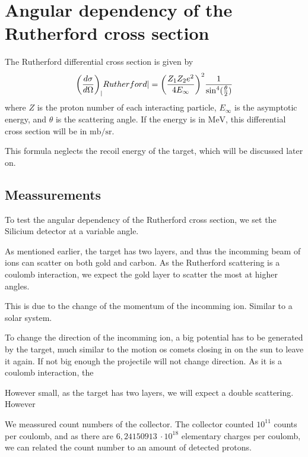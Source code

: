 \section{Angular dependency of the Rutherford cross section}
The Rutherford differential cross section \parencite[p. 16]{noteBB} is given by
\begin{align}
    {\left( \diff[d]{\sigma}{\Omega} \right)}_|Rutherford| =
    {\left(\frac{Z_1Z_2 e^2}{4E_{\infty}} \right)}^2
    \frac{1}{{{\sin}^4(\frac{\theta}{2})}}
\end{align}
where $Z$ is the proton number of each interacting particle, $E_{\infty}$ is
the asymptotic energy, and $\theta$ is the scattering angle. If the energy is
in $\si{\mega\electronvolt}$, this differential cross section will be in
$\si{\milli\barn\per\steradian}$.

This formula neglects the recoil energy of the target, which will be discussed
later on. 

\subsection{Meassurements}
To test the angular dependency of the Rutherford cross section, we set the
Silicium detector at a variable angle.

As mentioned earlier, the target has two layers, and thus the incomming beam of
ions can scatter on both gold and carbon. As the Rutherford scattering is a
coulomb interaction, we expect the gold layer to scatter the most at higher angles.

This is due to the change of the momentum of the incomming ion. Similar to a
solar system.

To change the direction of the incomming ion, a big potential has to be
generated by the target, much similar to the motion os comets closing in on the
sun to leave it again. If not big enough the projectile will not change
direction. As it is a coulomb interaction, the 

However small, as the target has two layers, we will expect a double scattering. However







We meassured count numbers of the collector. The collector counted $10^{11}$
counts per coulomb, and as there are $6,24150913\ \cdot10^{18}$ elementary
charges per coulomb, we can related the count number to an amount of detected
protons.

